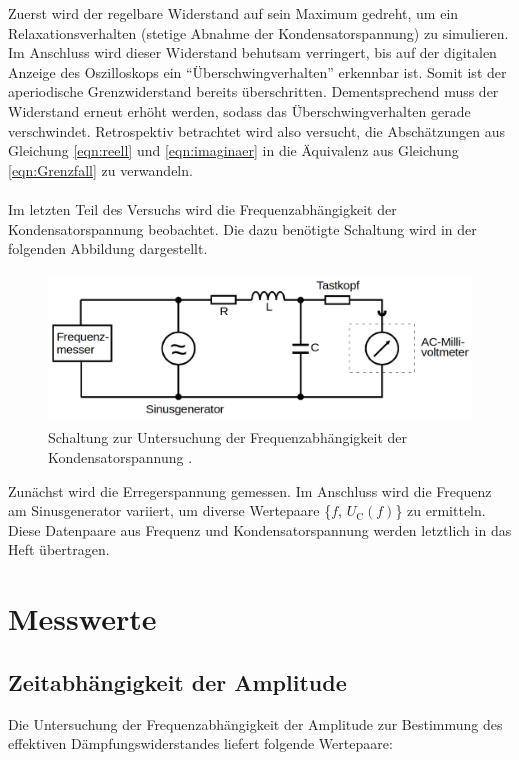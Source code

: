 \noindent Zuerst wird der regelbare Widerstand auf sein Maximum gedreht, um ein Relaxationsverhalten (stetige Abnahme der
Kondensatorspannung) zu simulieren. Im Anschluss wird dieser Widerstand behutsam verringert, bis auf der digitalen Anzeige 
des Oszilloskops ein \enquote{Überschwingverhalten} erkennbar ist. Somit ist der aperiodische Grenzwiderstand bereits überschritten.
Dementsprechend muss der Widerstand erneut erhöht werden, sodass das Überschwingverhalten gerade verschwindet. Retrospektiv 
betrachtet wird also versucht, die Abschätzungen aus Gleichung \eqref{eqn:reell} und \eqref{eqn:imaginaer} in die Äquivalenz 
aus Gleichung \eqref{eqn:Grenzfall} zu verwandeln.\\\\

\noindent Im letzten Teil des Versuchs wird die Frequenzabhängigkeit der Kondensatorspannung beobachtet. Die dazu 
benötigte Schaltung wird in der folgenden Abbildung dargestellt.

\begin{figure}[H]
    \centering
    \includegraphics[height=4cm]{5c.png}
    \caption{Schaltung zur Untersuchung der Frequenzabhängigkeit der Kondensatorspannung \cite{Versuchsanleitung_v354}.}
    \label{fig:5c}
\end{figure}

\noindent Zunächst wird die Erregerspannung gemessen. Im Anschluss wird die Frequenz am Sinusgenerator variiert, um 
diverse Wertepaare \{$f$, $U_\text{C}(f)$\} zu ermitteln. Diese Datenpaare aus Frequenz und Kondensatorspannung werden letztlich in 
das Heft übertragen.

\section{Messwerte}

\subsection{Zeitabhängigkeit der Amplitude}

Die Untersuchung der Frequenzabhängigkeit der Amplitude zur Bestimmung des effektiven Dämpfungswiderstandes liefert
folgende Wertepaare:

